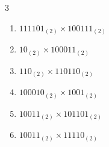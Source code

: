 \begin{multicols}{3}
\begin{enumerate}
  \item $111101_{(2)} \times 100111_{(2)}$


\columnbreak %

  \item $10_{(2)} \times 100011_{(2)}$


  \item $110_{(2)} \times 110110_{(2)}$


  \item $100010_{(2)} \times 1001_{(2)}$


  \item $10011_{(2)} \times 101101_{(2)}$


  \item $10011_{(2)} \times 11110_{(2)}$


\end{enumerate}
\end{multicols}

\newpage
\resetdrill


